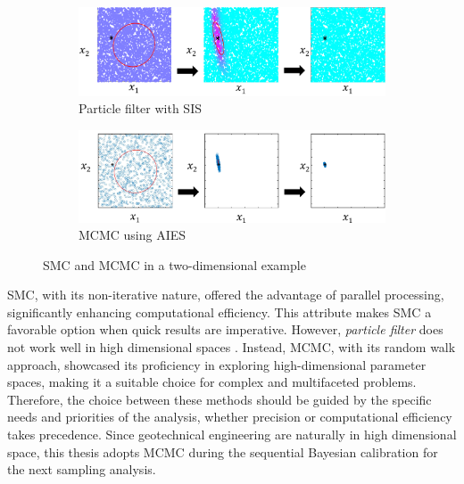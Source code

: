 \begin{figure}[ht]
\centering
\begin{subfigure}[htbp]{1.0\textwidth}
   \includegraphics[width=140mm]{Figures/figure-PFvsMCMC-SIS.pdf}
   \caption{Particle filter with \acrlong{SIS}}
   \label{fig: PFvsMCMC_1} 
\end{subfigure}

\begin{subfigure}[htbp]{1.0\textwidth}
   \includegraphics[width=140mm]{Figures/figure-PFvsMCMCAIES.pdf}
   \caption{\acrlong{MCMC} using \acrlong{AIES}}
   \label{fig: PFvsMCMC_2}
\end{subfigure}

\caption[Two sampling method]{\acrshort{SMC} and \acrshort{MCMC} in a two-dimensional example}
\end{figure}

SMC, with its non-iterative nature, offered the advantage of parallel processing, significantly enhancing computational efficiency. This attribute makes \acrshort{SMC} a favorable option when quick results are imperative. However, \textit{particle filter} does not work well in high dimensional spaces \citep{murphy2012}. Instead, \acrshort{MCMC}, with its random walk approach, showcased its proficiency in exploring high-dimensional parameter spaces, making it a suitable choice for complex and multifaceted problems. Therefore, the choice between these methods should be guided by the specific needs and priorities of the analysis, whether precision or computational efficiency takes precedence. Since geotechnical engineering are naturally in high dimensional space, this thesis adopts \acrshort{MCMC} during the sequential Bayesian calibration for the next sampling analysis.



